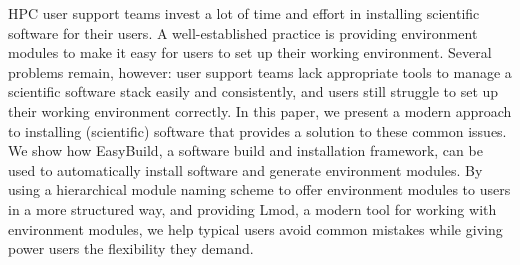 HPC user support teams invest a lot of time and effort in installing
scientific software for their users. A well-established practice is
providing environment modules to make it easy for users to set up their
working environment.  Several problems remain, however: user support
teams lack appropriate tools to manage a scientific software stack
easily and consistently, and users still struggle to set up their
working environment correctly.  In this paper, we present a modern
approach to installing (scientific) software that provides a solution
to these common issues. We show how EasyBuild, a software build and
installation framework, can be used to automatically install software
and generate environment modules.  By using a hierarchical module naming
scheme to offer environment modules to users in a more structured way, and
providing Lmod, a modern tool for working with environment modules, we help
typical users avoid common mistakes while giving power users the
flexibility they demand.
